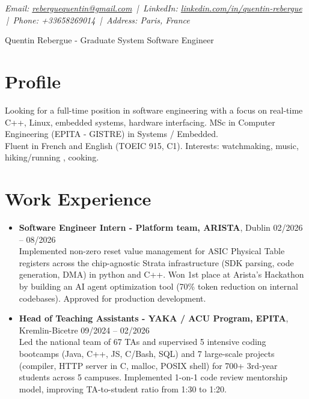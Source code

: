 \documentclass[9pt,a4paper]{article}
\newcommand{\namefont}{\fontsize{20}{22}\selectfont}
\newcommand{\tinyscript}{\fontsize{8}{9}\selectfont}
\begin{document}
\renewcommand\normalsize{\fontsize{10.5}{15}\selectfont}
\normalsize

\begin{center}
  {\tinyscript\itshape
  Email: \href{mailto:reberguequentin@gmail.com}{reberguequentin@gmail.com} \,|\,
  LinkedIn: \href{https://linkedin.com/in/quentin-rebergue}{linkedin.com/in/quentin-rebergue} \,|\,
  Phone: +33658269014 \,|\,
  Address: Paris, France}
\end{center}

\begin{center}
  {\namefont Quentin Rebergue - Graduate System Software Engineer}
\end{center}

\section*{Profile}
\begin{tcolorbox}[mybox2]
Looking for a full-time position in software engineering with a focus on real-time C++, Linux, embedded systems, hardware interfacing. MSc in Computer Engineering (EPITA - GISTRE) in Systems / Embedded.\\[0.3em]
Fluent in French and English (TOEIC 915, C1). Interests: watchmaking, music, hiking/running , cooking.
\end{tcolorbox}

\section*{Work Experience}
\begin{tcolorbox}[mybox]
\begin{itemize}
\item\textbf{Software Engineer Intern - Platform team, ARISTA}, Dublin \hfill {\small02/2026 – 08/2026}\\[0.5em]
\textcolor{gray!40!black}{Implemented non-zero reset value management for ASIC Physical Table registers across the chip-agnostic Strata infrastructure (SDK parsing, code generation, DMA) in python and C++.
Won 1st place at Arista's Hackathon by building an AI agent optimization tool (70\% token reduction on internal codebases). Approved for production development.}

\item\textbf{Head of Teaching Assistants - YAKA / ACU Program, EPITA}, Kremlin-Bicetre \hfill {\small09/2024 – 02/2026}\\[0.5em]
\textcolor{gray!40!black}{Led the national team of 67 TAs and supervised 5 intensive coding bootcamps (Java, C++, JS, C/Bash, SQL) and 7 large-scale projects (compiler, HTTP server in C, malloc, POSIX shell) for 700+ 3rd-year students across 5 campuses. Implemented 1-on-1 code review mentorship model, improving TA-to-student ratio from 1:30 to 1:20.}
\end{itemize}
\end{tcolorbox}
\end{document}
